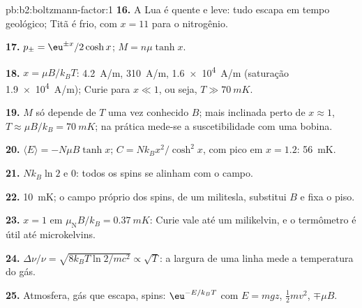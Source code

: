 \begin{solution}{pb:b2:boltzmann-factor:1}
\textbf{16.} A Lua é quente e leve: tudo escapa em
tempo geológico; Titã é frio, com $x = 11$ para o nitrogênio.

\textbf{17.} $p_\pm = \eu^{\pm x}/2\cosh x$; $M = n\mu\tanh x$.

\textbf{18.} $x = \mu B/k_BT$: \qty{4.2}{A/m}, \qty{310}{A/m}, \qty{1.6e4}{A/m}
(saturação \qty{1.9e4}{A/m}); Curie para $x \ll 1$, ou seja, $T \gg \qty{70}{mK}$.

\textbf{19.} $M$ só depende de $T$ uma vez conhecido $B$; mais inclinada perto de
$x \approx 1$, $T \approx \mu B/k_B = \qty{70}{mK}$; na prática mede-se a
suscetibilidade com uma bobina.

\textbf{20.} $\langle E\rangle = -N\mu B\tanh x$; $C = Nk_Bx^2/\cosh^2x$, com pico em
$x = 1.2$: \qty{56}{mK}.

\textbf{21.} $Nk_B\ln 2$ e $0$: todos os spins se alinham com o campo.

\textbf{22.} \qty{10}{mK}; o campo próprio dos spins, de um militesla, substitui $B$
e fixa o piso.

\textbf{23.} $x = 1$ em $\mu_{\text{N}}B/k_B = \qty{0.37}{mK}$: Curie vale até um
milikelvin, e o termômetro é útil até microkelvins.

\textbf{24.} $\Delta\nu/\nu = \sqrt{8k_BT\ln2/mc^2} \propto \sqrt T$: a largura
de uma linha mede a temperatura do gás.

\textbf{25.} Atmosfera, gás que escapa, spins: $\eu^{-E/k_BT}$ com $E = mgz$,
$\tfrac12mv^2$, $\mp\mu B$.
\end{solution}
